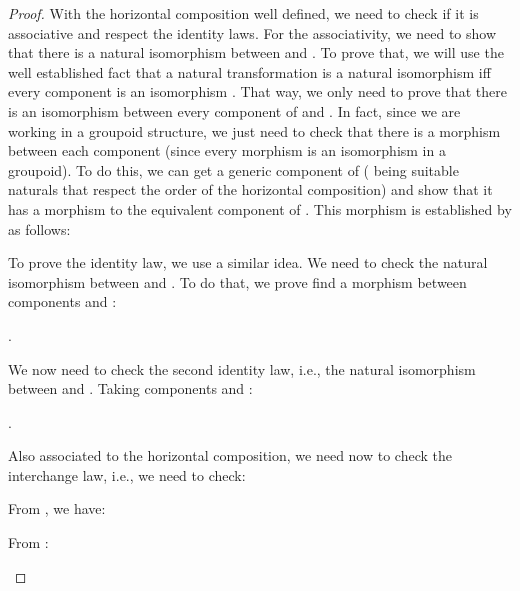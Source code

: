 \documentclass[12pt, a4paper,  oneside, headinclude,footinclude, BCOR5mm]{scrartcl}
\begin{document}
\begin{proof}
With the horizontal composition well defined, we need to check if it is associative and respect the identity laws. For the associativity, we need to show that there is a natural isomorphism  between  and  . To prove that, we will use the well established fact that a natural transformation is a natural isomorphism iff every component is an isomorphism \cite{Steve2}. That way, we only need to prove that there is an isomorphism between every component of  and  . In fact, since we are working in a groupoid structure, we just need to check that there is a morphism between each component (since every morphism is an isomorphism in a groupoid). To do this, we can get a generic component  of   ( being suitable naturals that respect the order of the horizontal composition) and show that it has a morphism to the equivalent component  of  . This morphism is established by  as follows:

\begin{center}

\end{center}

To prove the identity law, we use a similar idea. We need to check the natural isomorphism   between    and . To do that, we prove find a morphism between components  and :

\begin{center}
.
\end{center}

We now need to check the second identity law, i.e., the natural isomorphism  between   and . Taking components  and :

\begin{center}
.
\end{center}

Also associated to the horizontal composition, we need now to check the interchange law, i.e., we need to check:

\begin{center}

\end{center}

From  , we have:

\begin{center}
 

 




\end{center}

From   :

\begin{center}
 


\end{center}
\end{proof}
\end{document}
